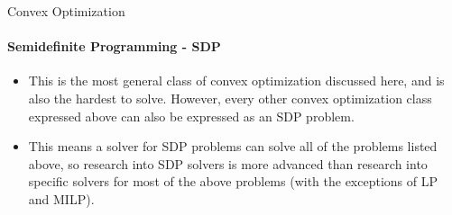 \documentclass{beamer}
\renewcommand{\vec}{\mathbf}
\begin{document}
%	
	\begin{frame}{Convex Optimization}
		\framesubtitle{Semidefinite Programming - SDP}
		\begin{itemize}
			\item This is the most general class of convex optimization discussed here, and is also the hardest to solve. However, every other convex optimization class expressed above can also be expressed as an SDP problem.
			\item This means a solver for SDP problems can solve all of the problems listed above, so research into SDP solvers is more advanced than research into specific solvers for most of the above problems (with the exceptions of LP and MILP).
		\end{itemize}
	\end{frame}
%	
\end{document}

